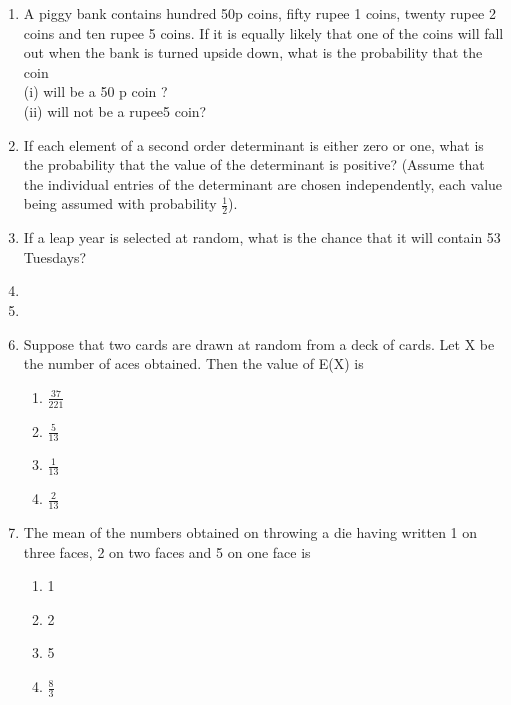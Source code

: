 \begin{enumerate}[label=\thesection.\arabic*.,ref=\thesection.\theenumi]
\item A piggy bank contains hundred 50p coins, fifty rupee 1 coins, twenty rupee 2 coins and ten rupee 5 coins. If it is equally likely that one of the coins will fall out when the bank is turned upside down, what is the probability that the coin \\
(i) will be a 50 p coin ?\\
(ii) will not be a rupee5 coin?\item If each element of a second order determinant is either zero or one, what is the
probability that the value of the determinant is positive? (Assume that the individual entries of the determinant are chosen independently, each value being
assumed with probability $\frac{1}{2}$).\\
\item If a leap year is selected at random, what is the chance that it will contain 53
Tuesdays?\\
\solution

\item
\item
\item Suppose that two cards are drawn at random from a deck of cards. Let X be the number of aces obtained. Then the value of E(X) is\\
\begin{enumerate}
\item $\frac{37}{221}$
\item $\frac{5}{13}$
\item $\frac{1}{13}$
\item $\frac{2}{13}$
\end{enumerate}
\solution


\item The mean of the numbers obtained on throwing a die having written 1 on three faces, 2 on two faces and 5 on one face is\\
\begin{enumerate}
\item 1
\item 2
\item 5
\item $\frac{8}{3}$
\end{enumerate}
\solution



\end{enumerate}
